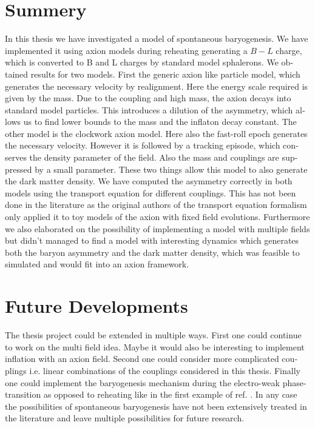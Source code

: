 \documentclass[master,       %
               twoside,        %
               BCOR10mm,       %
               english,ngerman, %
               ]{GAUBM}
\begin{document}
\begin{otherlanguage}{english}
\section{Summery}
In this thesis we have investigated a model of spontaneous baryogenesis.
We have implemented it using axion models during reheating generating a $B - L$ charge, which is converted to B and L charges by standard model sphalerons.
We obtained results for two models. First the generic axion like particle model, which generates the necessary velocity by realignment.
Here the energy scale required is given by the mass. Due to the coupling and high mass, the axion decays into standard model particles.
This introduces a dilution of the asymmetry, which allows us to find lower bounds to the mass and the inflaton decay constant.
The other model is the clockwork axion model.
Here also the fast-roll epoch generates the necessary velocity. However it is followed by a tracking episode, which conserves the density parameter of the field.
Also the mass and couplings are suppressed by a small parameter.
These two things allow this model to also generate the dark matter density.
We have computed the asymmetry correctly in both models using the transport equation for different couplings. This has not been done in the literature as the original authors of the transport equation formalism only applied it to toy models of the axion with fixed field evolutions.
Furthermore we also elaborated on the possibility of implementing a model with multiple fields
but didn't managed to find a model with interesting dynamics which generates both the baryon asymmetry and the dark matter density, which was feasible to simulated and would fit into an axion framework.

\section{Future Developments}
The thesis project could be extended in multiple ways.
First one could continue to work on the multi field idea. Maybe it would also be interesting to implement inflation with an axion field.
Second one could consider more complicated couplings i.e. linear combinations of the couplings considered in this thesis.
Finally one could implement the baryogenesis mechanism during the electro-weak phase-transition as opposed to reheating like in the first example of ref. \cite{Domcke:2020kcp_Generic_Couplings}.
In any case the possibilities of spontaneous baryogenesis have not been extensively treated in the literature and leave multiple possibilities for future research.



\end{otherlanguage}
\end{document}
